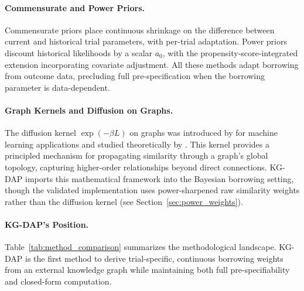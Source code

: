 \documentclass[12pt]{article}
\begin{document}
\paragraph{Commensurate and Power Priors.}
Commensurate priors \citep{hobbs2011hierarchical} place continuous shrinkage on the difference between current and historical trial parameters, with per-trial adaptation. Power priors \citep{ibrahim2000power} discount historical likelihoods by a scalar $a_0$, with the propensity-score-integrated extension \citep{wang2020propensity} incorporating covariate adjustment. All these methods adapt borrowing from outcome data, precluding full pre-specification when the borrowing parameter is data-dependent.

\paragraph{Graph Kernels and Diffusion on Graphs.}
The diffusion kernel $\exp(-\beta L)$ on graphs was introduced by \citet{kondor2002diffusion} for machine learning applications and studied theoretically by \citet{smola2003kernels}. This kernel provides a principled mechanism for propagating similarity through a graph's global topology, capturing higher-order relationships beyond direct connections. KG-DAP imports this mathematical framework into the Bayesian borrowing setting, though the validated implementation uses power-sharpened raw similarity weights rather than the diffusion kernel (see Section~\ref{sec:power_weights}).

\paragraph{KG-DAP's Position.}
Table~\ref{tab:method_comparison} summarizes the methodological landscape. KG-DAP is the first method to derive trial-specific, continuous borrowing weights from an external knowledge graph while maintaining both full pre-specifiability and closed-form computation.
\end{document}
